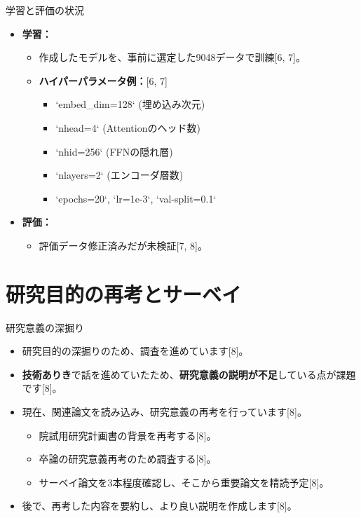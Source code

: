 \documentclass[unicode,12pt,aspectratio=169,dvipdfmx]{beamer}
\begin{document}
\begin{frame}{学習と評価の状況} %
    \begin{itemize}
        \item \textbf{学習：}
        \begin{itemize}
            \item 作成したモデルを、事前に選定した9048データで訓練[6, 7]。
            \item \textbf{ハイパーパラメータ例：}[6, 7]
            \begin{itemize}
                \item `embed_dim=128` (埋め込み次元)
                \item `nhead=4` (Attentionのヘッド数)
                \item `nhid=256` (FFNの隠れ層)
                \item `nlayers=2` (エンコーダ層数)
                \item `epochs=20`, `lr=1e-3`, `val-split=0.1`
            \end{itemize}
        \end{itemize}
        \item \textbf{評価：}
        \begin{itemize}
            \item 評価データ修正済みだが未検証[7, 8]。
        \end{itemize}
    \end{itemize}
\end{frame}

\section{研究目的の再考とサーベイ} %
\begin{frame}{研究意義の深掘り} %
    \begin{itemize}
        \item 研究目的の深掘りのため、調査を進めています[8]。
        \item \textbf{技術ありき}で話を進めていたため、\textbf{研究意義の説明が不足}している点が課題です[8]。
        \item 現在、関連論文を読み込み、研究意義の再考を行っています[8]。
        \begin{itemize}
            \item 院試用研究計画書の背景を再考する[8]。
            \item 卒論の研究意義再考のため調査する[8]。
            \item サーベイ論文を3本程度確認し、そこから重要論文を精読予定[8]。
        \end{itemize}
        \item 後で、再考した内容を要約し、より良い説明を作成します[8]。
    \end{itemize}
\end{frame}
\end{document}
